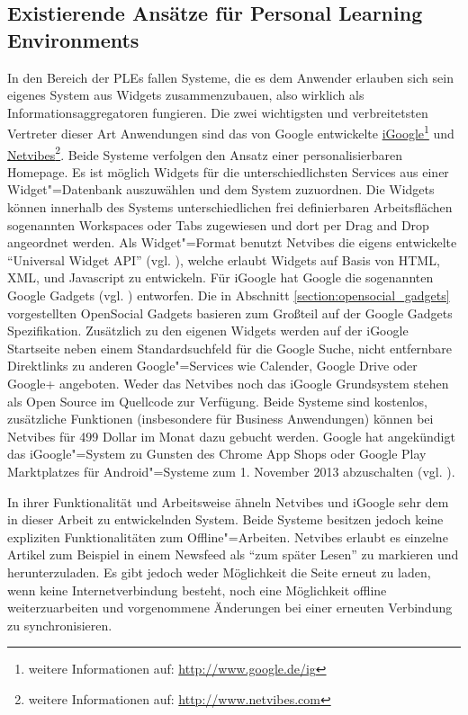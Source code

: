 \subsection{Existierende Ansätze für Personal Learning Environments}
In den Bereich der PLEs fallen Systeme, die es dem Anwender erlauben sich sein eigenes System aus Widgets zusammenzubauen, also wirklich als Informationsaggregatoren fungieren. Die zwei wichtigsten und verbreitetsten Vertreter dieser Art Anwendungen sind das von Google entwickelte \href{http://www.google.de/ig}{iGoogle}\footnote{weitere Informationen auf: \url{http://www.google.de/ig}} und \href{http://www.netvibes.com}{Netvibes}\footnote{weitere Informationen auf: \url{http://www.netvibes.com}}. Beide Systeme verfolgen den Ansatz einer personalisierbaren Homepage. Es ist möglich Widgets für die unterschiedlichsten Services aus einer Widget"=Datenbank auszuwählen und dem System zuzuordnen. Die Widgets können innerhalb des Systems unterschiedlichen frei definierbaren Arbeitsflächen sogenannten Workspaces oder Tabs zugewiesen und dort per Drag and Drop angeordnet werden. Als Widget"=Format benutzt Netvibes die eigens entwickelte "`Universal Widget API"' (vgl. \cite{UWAJSRuntime2012}), welche erlaubt Widgets auf Basis von HTML, XML, und Javascript zu entwickeln. Für iGoogle hat Google die sogenannten Google Gadgets (vgl. \cite{GoogleGadgetsApi2012}) entworfen. Die in Abschnitt \ref{section:opensocial_gadgets} vorgestellten OpenSocial Gadgets basieren zum Großteil auf der Google Gadgets Spezifikation. Zusätzlich zu den eigenen Widgets werden auf der iGoogle Startseite neben einem Standardsuchfeld für die Google Suche, nicht entfernbare Direktlinks zu anderen Google"=Services wie Calender, Google Drive oder Google+ angeboten. Weder das Netvibes noch das iGoogle Grundsystem stehen als Open Source im Quellcode zur Verfügung. Beide Systeme sind kostenlos, zusätzliche Funktionen (insbesondere für Business Anwendungen) können bei Netvibes für 499 Dollar im Monat dazu gebucht werden. Google hat angekündigt das iGoogle"=System zu Gunsten des Chrome App Shops oder Google Play Marktplatzes für Android"=Systeme zum 1. November 2013 abzuschalten (vgl. \cite{Google2012}).

In ihrer Funktionalität und Arbeitsweise ähneln Netvibes und iGoogle sehr dem in dieser Arbeit zu entwickelnden System. Beide Systeme besitzen jedoch keine expliziten Funktionalitäten zum Offline"=Arbeiten. Netvibes erlaubt es einzelne Artikel zum Beispiel in einem Newsfeed als "`zum später Lesen"' zu markieren und herunterzuladen. Es gibt jedoch weder Möglichkeit die Seite erneut zu laden, wenn keine Internetverbindung besteht, noch eine Möglichkeit offline weiterzuarbeiten und vorgenommene Änderungen bei einer erneuten Verbindung zu synchronisieren. 

